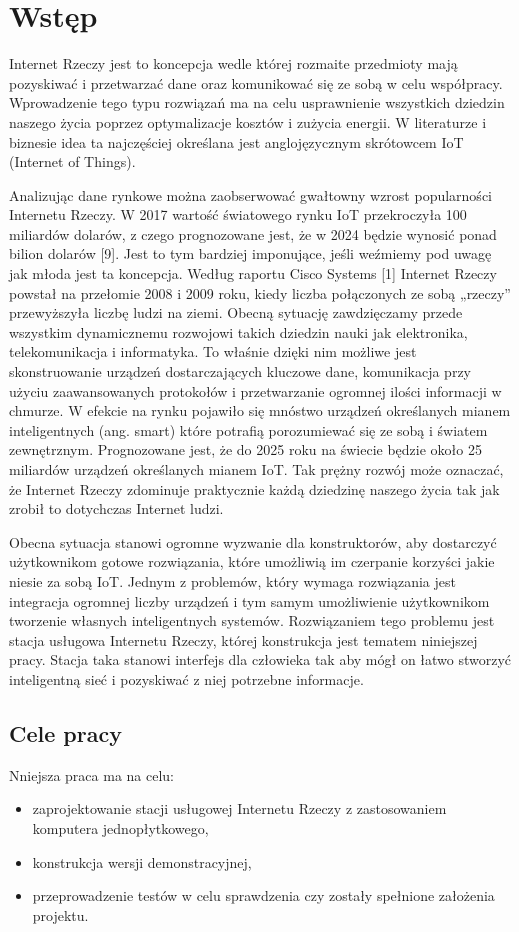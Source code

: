 \documentclass[12pt, twoside, openany]{mwrep}
\begin{document}
\chapter{Wstęp}
\par
Internet Rzeczy jest to koncepcja wedle której rozmaite przedmioty mają pozyskiwać i przetwarzać dane oraz komunikować się ze sobą w celu współpracy. Wprowadzenie tego typu rozwiązań ma na celu usprawnienie wszystkich dziedzin naszego życia poprzez optymalizacje kosztów i zużycia energii. W literaturze i biznesie idea ta najczęściej określana jest anglojęzycznym skrótowcem IoT (Internet of Things).
\par
Analizując dane rynkowe można zaobserwować gwałtowny wzrost popularności Internetu Rzeczy. W 2017 wartość światowego rynku IoT przekroczyła 100 miliardów dolarów, z czego prognozowane jest, że w 2024 będzie wynosić ponad bilion dolarów [9]. Jest to tym bardziej imponujące, jeśli weźmiemy pod uwagę jak młoda jest ta koncepcja. Według raportu Cisco Systems [1] Internet Rzeczy powstał na przełomie 2008 i 2009 roku, kiedy liczba połączonych ze sobą „rzeczy” przewyższyła liczbę ludzi na ziemi.
Obecną sytuację zawdzięczamy przede wszystkim dynamicznemu rozwojowi takich dziedzin nauki jak elektronika, telekomunikacja i informatyka. To właśnie dzięki nim możliwe jest skonstruowanie urządzeń dostarczających kluczowe dane, komunikacja przy użyciu zaawansowanych protokołów i przetwarzanie ogromnej ilości informacji w chmurze. W efekcie na rynku pojawiło się mnóstwo urządzeń określanych mianem inteligentnych (ang. smart) które potrafią porozumiewać się ze sobą i światem zewnętrznym. Prognozowane jest, że do 2025 roku na świecie będzie około 25 miliardów urządzeń określanych mianem IoT. Tak prężny rozwój może oznaczać, że Internet Rzeczy zdominuje praktycznie każdą dziedzinę naszego życia tak jak zrobił to dotychczas Internet ludzi.
\par
Obecna sytuacja stanowi ogromne wyzwanie dla konstruktorów, aby dostarczyć użytkownikom gotowe rozwiązania, które umożliwią im czerpanie korzyści jakie niesie za sobą IoT. Jednym z problemów, który wymaga rozwiązania jest integracja ogromnej liczby urządzeń i tym samym umożliwienie użytkownikom tworzenie własnych inteligentnych systemów. Rozwiązaniem tego problemu jest stacja usługowa Internetu Rzeczy, której konstrukcja jest tematem niniejszej pracy. Stacja taka stanowi interfejs dla człowieka tak aby mógł on łatwo stworzyć inteligentną sieć i pozyskiwać z niej potrzebne informacje.
\par
\section{Cele pracy}
Nniejsza praca ma na celu:
\begin{itemize}
    \item zaprojektowanie stacji usługowej Internetu Rzeczy z zastosowaniem komputera jednopłytkowego,
    \item konstrukcja wersji demonstracyjnej,
    \item przeprowadzenie testów w celu sprawdzenia czy zostały spełnione założenia projektu.
\end{itemize}   
\end{document}
